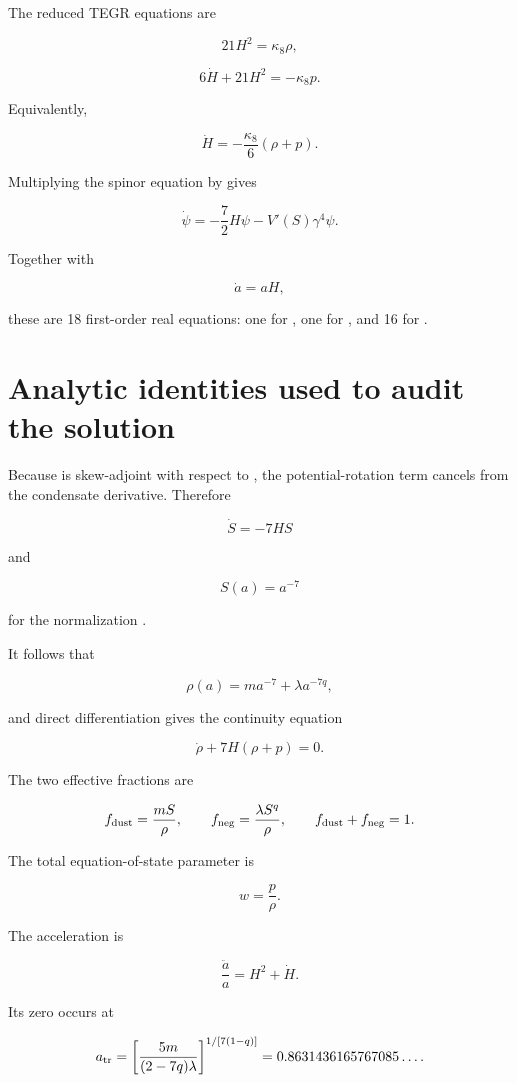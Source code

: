 \documentclass[11pt]{article}
\begin{document}
The reduced TEGR equations are

\[
\boxed{21H^2=\kappa_8\rho,}
\]

\[
\boxed{6\dot H+21H^2=-\kappa_8 p.}
\]

Equivalently,

\[
\dot H=-\frac{\kappa_8}{6}(\rho+p).
\]

Multiplying the spinor equation by \texttt{} gives

\[
\boxed{
\dot\psi=-\frac72H\psi-V'(S)\gamma^4\psi.}
\]

Together with

\[
\dot a=aH,
\]

these are 18 first-order real equations: one for \texttt{}, one for \texttt{}, and 16 for \texttt{}.

\section{Analytic identities used to audit the solution}

Because \texttt{} is skew-adjoint with respect to \texttt{}, the potential-rotation term cancels from the condensate derivative. Therefore

\[
\dot S=-7HS
\]

and

\[
\boxed{S(a)=a^{-7}}
\]

for the normalization \texttt{}.

It follows that

\[
\rho(a)=ma^{-7}+\lambda a^{-7q},
\]

and direct differentiation gives the continuity equation

\[
\dot\rho+7H(\rho+p)=0.
\]

The two effective fractions are

\[
f_{\rm dust}=\frac{mS}{\rho},
\qquad
f_{\rm neg}=\frac{\lambda S^q}{\rho},
\qquad
f_{\rm dust}+f_{\rm neg}=1.
\]

The total equation-of-state parameter is

\[
w=\frac{p}{\rho}.
\]

The acceleration is

\[
\frac{\ddot a}{a}=H^2+\dot H.
\]

Its zero occurs at

\[
a_{\rm tr}
=\left[
\frac{5m}{(2-7q)\lambda}
\right]^{1/[7(1-q)]}
=0.8631436165767085\ldots.
\]
\end{document}
